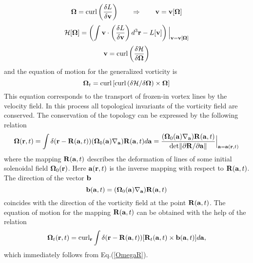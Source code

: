 \begin{equation}
{\bf\Omega}=\mbox{curl}\left(\frac{\delta L}{\delta{\bf v}}\right)\qquad
\Rightarrow \qquad {\bf v}={\bf v}[{\bf\Omega}]
\end{equation}
\begin{equation}
{\cal H}[{\bf\Omega}]=
\left(\int{\bf v}\cdot\left(\frac{\delta{ L}}{\delta{\bf v}}\right)d^3{\bf r}
-{L}[{\bf v}]\right)\Big|_{{\bf v}={\bf v}[{\bf\Omega}]}
\end{equation}
\begin{equation}
{\bf v}=\mbox{curl}\left(\frac{\delta{\cal H}}{\delta{\bf\Omega}}\right)
\end{equation}
and the equation of motion for the generalized vorticity is
\begin{equation}\label{Ham}
{\bf\Omega}_t=\mbox{curl}\,
[\mbox{curl}\,(\delta{\cal H}/\delta{\bf\Omega})\times{\bf\Omega}]
\end{equation}
This equation corresponds to the transport of frozen-in vortex lines by the 
velocity field. In this process all topological invariants \cite{MonSas} 
of the vorticity field are conserved. 
The conservation of the topology can be expressed by 
the following relation \cite{KR98}
\begin{equation}\label{OmegaR}
{\bf \Omega }({\bf r},t)=\int \delta({\bf r}-{\bf R}({\bf a},t))
({\bf \Omega}_{0}({\bf a})\nabla _{{\bf a}}){\bf R}({\bf a},t)d{\bf a}=
\frac{({\bf \Omega}_{0}({\bf a})\nabla _{{\bf a}}){\bf R}({\bf a},t)}
{\mbox{det}\|\partial{\bf R}/\partial{\bf a}\|}
\Big|_{{\bf a}={\bf a}({\bf r},t)}
\end{equation}
where the mapping ${\bf R}({\bf a},t)$ describes the deformation of lines of
some initial solenoidal field ${\bf \Omega}_{0}({\bf r})$. Here
${\bf a}({\bf r},t)$ is the inverse mapping with respect to
${\bf R}({\bf a},t)$. 
The direction of the vector ${\bf b}$
\begin{equation}\label{b}
{\bf b}({\bf a},t)=
({\bf \Omega}_{0}({\bf a})\nabla _{{\bf a}}){\bf R}({\bf a},t)
\end{equation}
coincides with the direction of the vorticity field at the point 
${\bf R}({\bf a},t)$. The equation of motion for the mapping 
${\bf R}({\bf a},t)$ can be obtained with the help of the relation
\begin{equation}\label{OmegaRt}
{\bf\Omega}_t({\bf r},t)=
\mbox{curl}_{\bf r}\int
\delta({\bf r}-{\bf R}({\bf a},t))
[{\bf R}_t({\bf a},t)\times{\bf b}({\bf a},t)]
d{\bf a},
\end{equation}
which immediately follows from Eq.(\ref{OmegaR}). 
